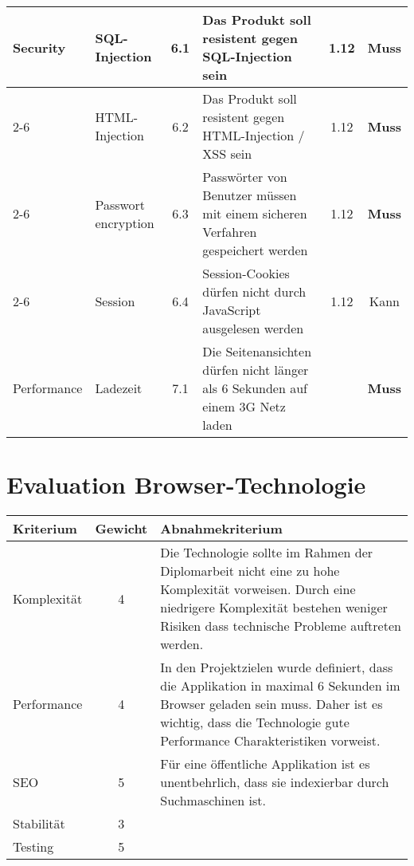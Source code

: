 \begin{longtable}[]{@{}p{1.9cm}p{2.5cm}cp{5.5cm}cc@{}}
  \midrule
  \multirow{9}{*}{Security}  & SQL-Injection              & 6.1          & Das Produkt soll resistent gegen SQL-Injection sein                                                         & 1.12          & \textbf{Muss}                \\ \cline{2-6}
                             & HTML-Injection             & 6.2          & Das Produkt soll resistent gegen HTML-Injection / XSS sein                                                  & 1.12          & \textbf{Muss}                \\ \cline{2-6}
                             & Passwort encryption        & 6.3          & Passwörter von Benutzer müssen mit einem sicheren Verfahren gespeichert werden                              & 1.12          & \textbf{Muss}                \\ \cline{2-6}
                             & Session                    & 6.4          & Session-Cookies dürfen nicht durch JavaScript ausgelesen werden                                             & 1.12          & Kann                         \\
  \midrule
  Performance                & Ladezeit                   & 7.1          & Die Seitenansichten dürfen nicht länger als 6 Sekunden auf einem 3G Netz laden                              &               & \textbf{Muss}                \\
  \bottomrule
\end{longtable}


\clearpage
\section{Evaluation Browser-Technologie}\label{evaluation-browser-technologie}

\begin{longtable}[]{@{}p{2cm}cp{10cm}@{}}
  \toprule
  \textbf{Kriterium} & \textbf{Gewicht} & \textbf{Abnahmekriterium}\tabularnewline
  \midrule
  \endhead
  Komplexität        & 4                & Die Technologie sollte im Rahmen der Diplomarbeit nicht eine zu hohe Komplexität vorweisen. Durch eine niedrigere Komplexität bestehen weniger Risiken dass technische Probleme auftreten werden.\tabularnewline
  \midrule
  Performance        & 4                & In den Projektzielen wurde definiert, dass die Applikation in maximal 6 Sekunden im Browser geladen sein muss. Daher ist es wichtig, dass die Technologie gute Performance Charakteristiken vorweist.\tabularnewline
  \midrule
  SEO                & 5                & Für eine öffentliche Applikation ist es unentbehrlich, dass sie indexierbar durch Suchmaschinen ist.\tabularnewline
  \midrule
  Stabilität         & 3                & \tabularnewline
  \midrule
  Testing            & 5                & \tabularnewline
  \bottomrule
\end{longtable}

